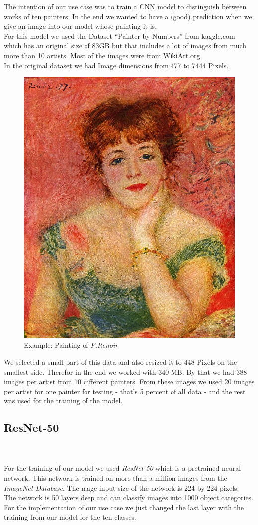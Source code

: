 \documentclass[
	12pt, %
]{fphw}
\begin{document}
\noindent The intention of our use case was to train a CNN model to distinguish between works of ten
painters. In the end we wanted to have a (good) prediction when we give an image into our model whose painting it is.\\

\noindent For this model we used the Dataset ``Painter by Numbers'' from kaggle.com which has an original size of 83GB  but that includes a lot of images from much more than 10 artists. Most of the images were from WikiArt.org.\\
 In the original dataset we had Image dimensions from 477 to 7444 Pixels.\\

\begin{figure}[H]
	\center\includegraphics[width=0.2 \textwidth]{Renoir.jpg}
	\caption*{Example: Painting of \textit{P.Renoir}}
\end{figure}

\noindent We selected a small part of this data and also resized it to 448 Pixels on the smallest side. Therefor in the end we worked with 340 MB. 
By that we had 388 images per artist from 10 different painters. From these images we used 20 images per artist for one painter for testing - that's 5 percent of all data - and the rest was used for the training of the model.\\

\subsection*{ResNet-50}

\ \\  \ \\
\noindent For the training of our model we used \textit{ResNet-50} which is a pretrained neural network. This network is trained on more than a million images from the \textit{ImageNet Database}. 
The mage input size of the network is 224-by-224 pixels.\\

\noindent The network is 50 layers deep and can classify images into 1000 object categories. 
For the implementation of our use case we just changed the last layer with the training from our model for the ten classes. \\
\end{document}

